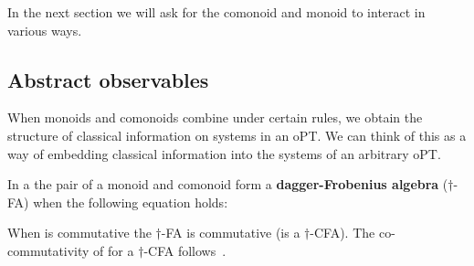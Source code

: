 In the next section we will ask for the comonoid and monoid to interact in various ways.

\subsection{Abstract observables}

When monoids and comonoids combine under certain rules, we obtain the structure of classical information on systems in an oPT. We can think of this as a way of embedding classical information into the systems of an arbitrary oPT.

\begin{defn}
\label{def:frobenius}
In a \dsmc the pair of a monoid  and comonoid  form a \textbf{dagger-Frobenius algebra} ($\dagger$-FA) when the following equation holds:
\begin{equation}
\label{eq:frobenius}

\end{equation}
\end{defn}
When \tinymult[whitedot] is commutative the $\dagger$-FA is commutative (is a $\dagger$-CFA). The co-commutativity of \tinycomult[whitedot] for a $\dagger$-CFA follows~\cite[Thm 3.2.8]{kissinger2012pictures}.


